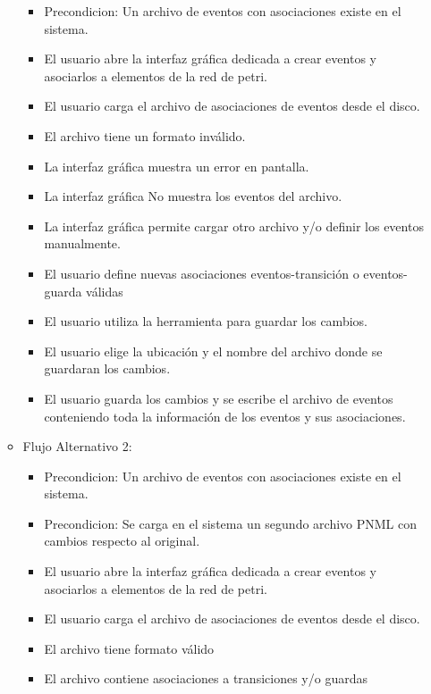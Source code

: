 \begin{itemize}
\begin{itemize}
\begin{itemize}
       		    \item  Precondicion: Un archivo de eventos con asociaciones existe
       		    en el sistema.
       		    \item El usuario abre la interfaz gráfica dedicada a crear eventos
       		    y asociarlos a elementos de la red de petri.
       		    \item El usuario carga el archivo de asociaciones de eventos desde
       		    el disco.
       		    \item El archivo tiene un formato inválido.
       		    \item La interfaz gráfica muestra un error en pantalla.
       		    \item La interfaz gráfica No muestra los eventos del archivo. 
       		    \item La interfaz gráfica permite cargar otro archivo y/o definir
       		    los eventos manualmente.
       		    \item El usuario define nuevas asociaciones
       		    eventos-transición o eventos-guarda válidas
       		    \item El usuario utiliza la herramienta para guardar los cambios.
       		    \item El usuario elige la ubicación y el nombre del archivo donde
       		    se guardaran los cambios.
       		    \item El usuario guarda los cambios y se escribe el archivo de
       		    eventos conteniendo toda la información de los eventos y sus
       		    asociaciones.
   		    \end{itemize}
       	\item Flujo Alternativo 2: 
       		\begin{itemize}
       		    \item  Precondicion: Un archivo de eventos con asociaciones existe
       		    en el sistema.
       		    \item Precondicion: Se carga en el sistema un segundo archivo PNML
       		    con cambios respecto al original.
       		    \item El usuario abre la interfaz gráfica dedicada a crear eventos
       		    y asociarlos a elementos de la red de petri.
       		    \item El usuario carga el archivo de asociaciones de eventos desde
       		    el disco.
       		    \item El archivo tiene formato válido
       		    \item El archivo contiene asociaciones a transiciones y/o guardas

\end{itemize}
\end{itemize}
\end{itemize}
